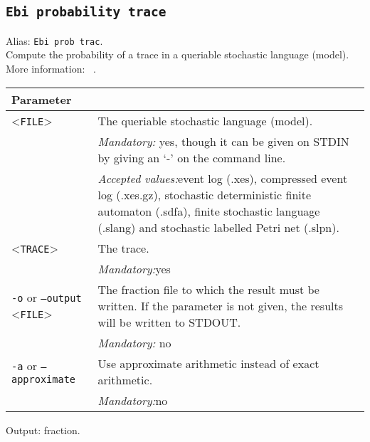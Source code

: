 {\subsection{\texttt{Ebi probability trace}}
\label{command:Ebi probability trace}
Alias: \texttt{Ebi prob trac}.\\
Compute the probability of a trace in a queriable stochastic language (model).\\
More information: ~\cite{DBLP:journals/is/LeemansMM24}.\\
\begin{tabularx}{\linewidth}{lX}
\toprule
Parameter \\\midrule
<\texttt{FILE}>&The queriable stochastic language (model).\\
&\textit{Mandatory:} \quad yes, though it can be given on STDIN by giving an `-' on the command line.\\
&\textit{Accepted values:}\quad event log (.xes), compressed event log (.xes.gz), stochastic deterministic finite automaton (.sdfa), finite stochastic language (.slang) and stochastic labelled Petri net (.slpn).\\
<\texttt{TRACE}>
&The trace.\\
&\textit{Mandatory:}\quad yes\\
\texttt{-o} or \texttt{--output} <\texttt{FILE}> &
The fraction file to which the result must be written. If the parameter is not given, the results will be written to STDOUT.\\
&\textit{Mandatory:} \quad no\\
\texttt{-a} or \texttt{--approximate} & Use approximate arithmetic instead of exact arithmetic.\\
&\textit{Mandatory:}\quad no\\
\bottomrule
\end{tabularx}
Output: fraction.
}
